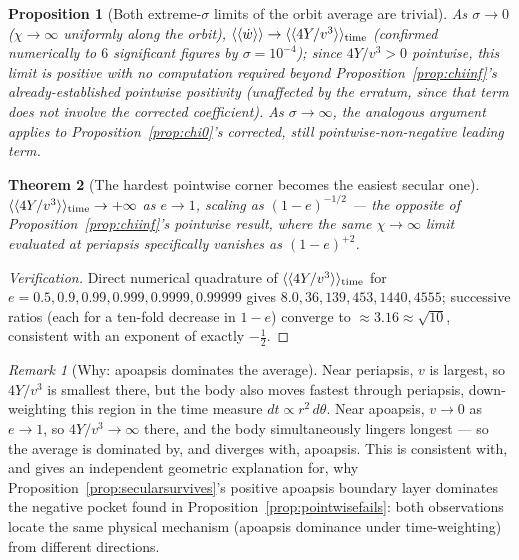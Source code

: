 \documentclass[12pt]{amsart}
\theoremstyle{plain}
\newtheorem{theorem}{Theorem}[section]
\newtheorem{proposition}[theorem]{Proposition}
\theoremstyle{remark}
\newtheorem*{remark}{Remark}
\begin{document}
\begin{proposition}[Both extreme-$\sigma$ limits of the orbit average are trivial]\label{prop:orbitavglimits}
As $\sigma\to0$ ($\chi\to\infty$ uniformly along the orbit), $\langle\langle\dot w\rangle\rangle\to\langle\langle4Y/v^3\rangle\rangle_{\rm time}$ (confirmed numerically to $6$ significant figures by $\sigma=10^{-4}$); since $4Y/v^3>0$ pointwise, this limit is positive with no computation required beyond Proposition~\ref{prop:chiinf}'s already-established pointwise positivity (unaffected by the erratum, since that term does not involve the corrected coefficient). As $\sigma\to\infty$, the analogous argument applies to Proposition~\ref{prop:chi0}'s corrected, still pointwise-non-negative leading term.
\end{proposition}

\begin{theorem}[The hardest pointwise corner becomes the easiest secular one]\label{thm:reversal}
$\langle\langle4Y/v^3\rangle\rangle_{\rm time}\to+\infty$ as $e\to1$, scaling as $(1-e)^{-1/2}$ --- the opposite of Proposition~\ref{prop:chiinf}'s pointwise result, where the same $\chi\to\infty$ limit evaluated \emph{at periapsis specifically} vanishes as $(1-e)^{+2}$.
\end{theorem}

\begin{proof}[Verification]
Direct numerical quadrature of $\langle\langle4Y/v^3\rangle\rangle_{\rm time}$ for $e=0.5,0.9,0.99,0.999,0.9999,0.99999$ gives $8.0,36,139,453,1440,4555$; successive ratios (each for a ten-fold decrease in $1-e$) converge to $\approx3.16\approx\sqrt{10}$, consistent with an exponent of exactly $-\tfrac12$.
\end{proof}

\begin{remark}[Why: apoapsis dominates the average]
Near periapsis, $v$ is largest, so $4Y/v^3$ is smallest there, but the body also moves fastest through periapsis, down-weighting this region in the time measure $dt\propto r^2\,d\theta$. Near apoapsis, $v\to0$ as $e\to1$, so $4Y/v^3\to\infty$ there, and the body simultaneously lingers longest --- so the average is dominated by, and diverges with, apoapsis. This is consistent with, and gives an independent geometric explanation for, why Proposition~\ref{prop:secularsurvives}'s positive apoapsis boundary layer dominates the negative pocket found in Proposition~\ref{prop:pointwisefails}: both observations locate the same physical mechanism (apoapsis dominance under time-weighting) from different directions.
\end{remark}
\end{document}
